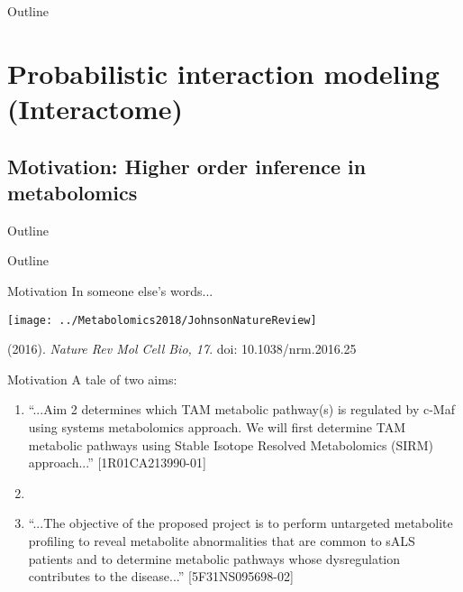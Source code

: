 \documentclass[xcolor=dvipsnames]{beamer}
\begin{document}
\begin{frame}{Outline}
	\vspace{-10.5pt}
	\tableofcontents[hideallsubsections]
\end{frame}

\section{Probabilistic interaction modeling (Interactome)}
\subsection{Motivation: Higher order inference in metabolomics}
\begin{frame}{Outline}
	\vspace{-10.5pt}
	\tableofcontents[currentsection,subsectionstyle=hide]
\end{frame}

\begin{frame}{Outline}
	\vspace{-10.5pt}
	\tableofcontents[currentsection,subsectionstyle=show/shaded/hide]
\end{frame}

\begin{frame}{Motivation}
	\vspace{-15.5pt}
	{\LARGE In someone else's words...}
	\begin{center}
		\texttt{[image: ../Metabolomics2018/JohnsonNatureReview]}
	\end{center}
	(2016). \emph{Nature Rev Mol Cell Bio, 17}. doi: 10.1038/nrm.2016.25
\end{frame}

\begin{frame}{Motivation}
	\vspace{-10pt}
		{\LARGE A tale of two aims:}
		
		\begin{enumerate}[{1)}]
			\item ``...Aim 2 determines which TAM metabolic pathway(s) is regulated by c-Maf using systems metabolomics approach. We will first determine TAM metabolic pathways using Stable Isotope Resolved Metabolomics (SIRM) approach...'' [1R01CA213990-01] \pause
			\item[]
			\item ``...The objective of the proposed project is to perform untargeted metabolite profiling to reveal metabolite abnormalities that are common to sALS patients and to determine metabolic pathways whose dysregulation contributes to the disease...'' [5F31NS095698-02]
		\end{enumerate}
\end{frame}
\end{document}
